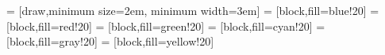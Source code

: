 \documentclass{article}
\begin{document}

     = [draw,minimum size=2em, minimum width=3em]
     = [block,fill=blue!20]
     = [block,fill=red!20]
     = [block,fill=green!20]
     = [block,fill=cyan!20]
     = [block,fill=gray!20]
     = [block,fill=yellow!20]
    
\end{document}
